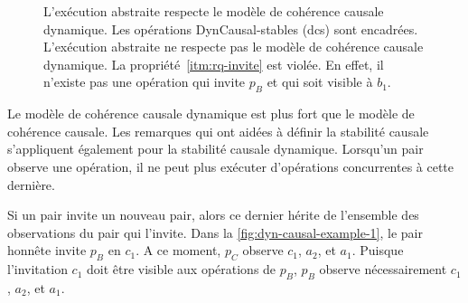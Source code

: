 \begin{figure}[htb]
\begin{subfigure}{\linewidth}
    \caption{}\label{fig:dyn-causal-example-2}
\end{subfigure}
\caption[Stabilité causale dynamique]{L'exécution abstraite  respecte le modèle de cohérence causale dynamique.
Les opérations DynCausal-stables (dcs) sont encadrées.
L'exécution abstraite  ne respecte pas le modèle de cohérence causale dynamique.
La propriété~\ref{itm:rq-invite} est violée.
En effet, il n'existe pas une opération qui invite $p_B$ et qui soit visible à $b_1$.}\label{fig:dyn-causal-example}
\end{figure}


Le modèle de cohérence causale dynamique est plus fort que le modèle de cohérence causale.
Les remarques qui ont aidées à définir la stabilité causale s'appliquent également pour la stabilité causale dynamique.
Lorsqu'un pair observe une opération, il ne peut plus exécuter d'opérations concurrentes à cette dernière.

Si un pair invite un nouveau pair, alors ce dernier hérite de l'ensemble des observations du pair qui l'invite.
Dans la \autoref{fig:dyn-causal-example-1}, le pair honnête invite $p_B$ en $c_1$.
A ce moment, $p_C$ observe $c_1$, $a_2$, et $a_1$.
Puisque l'invitation $c_1$ doit être visible aux opérations de $p_B$, $p_B$ observe nécessairement $c_1$, $a_2$, et $a_1$.

